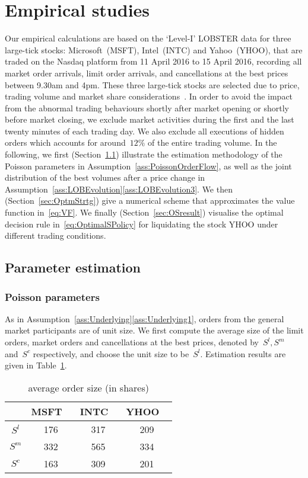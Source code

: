 \documentclass{amsart}[11pt]
\numberwithin{equation}{section}
\theoremstyle{definition}
\begin{document}
\section{Empirical studies}\label{sec:empirical}
Our empirical calculations are based on the `Level-I' LOBSTER data
for three large-tick stocks: Microsoft~(MSFT), Intel~(INTC) and Yahoo~(YHOO),
that are traded on the Nasdaq platform from 11 April 2016 to 15 April 2016,
recording all market order arrivals, limit order arrivals, 
and cancellations at the best prices between 9.30am and 4pm.
These three large-tick stocks are selected due to price, trading volume and market share considerations~\cite[Section 4]{bonart2017latency}.
In order to avoid the impact from the abnormal trading behaviours shortly after market opening 
or shortly before market closing,
we exclude market activities during the first and the last twenty minutes of each trading day.
We also exclude all executions of hidden orders which accounts for around~$12\%$ of the entire trading volume.
In the following, we first (Section~\ref{sec:EstMd}) illustrate the estimation methodology
of the Poisson parameters in Assumption~\ref{ass:PoissonOrderFlow},
as well as the joint distribution of the best volumes after a price change in Assumption~\ref{ass:LOBEvolution}\eqref{ass:LOBEvolution3}.
We then (Section~\ref{sec:OptmStrtg}) give a numerical scheme that approximates the value function in~\eqref{eq:VF}.
We finally (Section~\ref{sec:OSresult}) visualise the optimal decision rule in~\eqref{eq:OptimalSPolicy} for liquidating the stock YHOO under different trading conditions. 

\subsection{Parameter estimation}\label{sec:EstMd}
\subsubsection{Poisson parameters}
As in Assumption~\ref{ass:Underlying}\eqref{ass:Underlying1},
orders from the general market participants are of unit size. 
We first compute the average size of the limit orders, market orders and cancellations at the best prices, denoted by~$S^l, S^m$ and~$S^c$ respectively, and choose the unit size to be~$S^l$. 
Estimation results are given in Table~\ref{Tab:aos}.
\begin{table}[!htp]
\centering
\begin{tabular}{|c|c|c|c|}
\hline
 & \quad MSFT \,\,\,\quad & \quad INTC \,\,\,\quad & \quad YHOO \,\,\,\quad \\
\hline
$S^l$ &176 &317  & 209 \\
\hline
$S^m$ & 332& 565 & 334 \\
\hline
$S^c$ & 163 & 309 & 201 \\
\hline
\end{tabular}
\caption{average order size (in shares)}
\label{Tab:aos}
\end{table}
\end{document}
